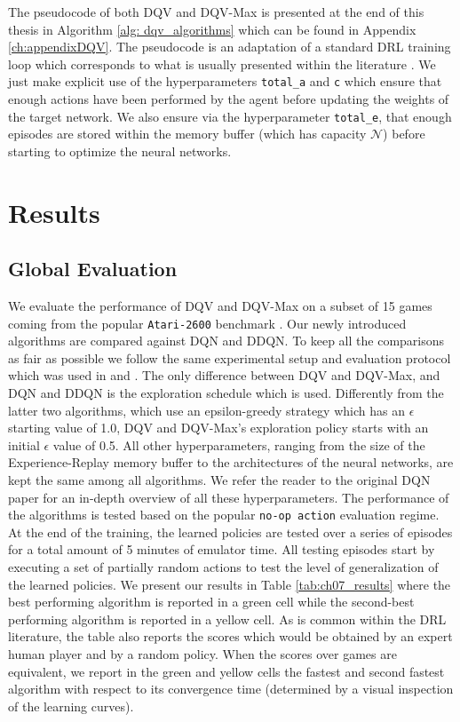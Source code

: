 The pseudocode of both DQV and DQV-Max is presented at the end of this thesis in Algorithm \ref{alg: dqv_algorithms} which can be found in Appendix \ref{ch:appendixDQV}. The pseudocode is an adaptation of a standard DRL training loop which corresponds to what is usually presented within the literature \cite{mnih2015human}. We just make explicit use of the hyperparameters \texttt{total\_a} and \texttt{c} which ensure that enough actions have been performed by the agent before updating the weights of the target network. We also ensure via the hyperparameter \texttt{total\_e}, that enough episodes are stored within the memory buffer (which has capacity $\mathcal{N}$) before starting to optimize the neural networks. 



\section{Results}
\label{sec:ijcnn_results}

\subsection{Global Evaluation}
\label{sec:global_evaluation}

We evaluate the performance of DQV and DQV-Max on a subset of 15 games coming from the popular \texttt{Atari-2600} benchmark \cite{bellemare2013arcade}. Our newly introduced algorithms are compared against DQN and DDQN. To keep all the comparisons as fair as possible we follow the same experimental setup and evaluation protocol which was used in \cite{mnih2015human} and \cite{van2016deep}. The only difference between DQV and DQV-Max, and DQN and DDQN is the exploration schedule which is used. Differently from the latter two algorithms, which use an epsilon-greedy strategy which has an $\epsilon$ starting value of 1.0, DQV and DQV-Max's exploration policy starts with an initial $\epsilon$ value of 0.5. All other hyperparameters, ranging from the size of the Experience-Replay memory buffer to the architectures of the neural networks, are kept the same among all algorithms. We refer the reader to the original DQN paper \cite{mnih2015human} for an in-depth overview of all these hyperparameters. The performance of the algorithms is tested based on the popular \texttt{no-op action} evaluation regime. At the end of the training, the learned policies are tested over a series of episodes for a total amount of 5 minutes of emulator time. All testing episodes start by executing a set of partially random actions to test the level of generalization of the learned policies. We present our results in Table \ref{tab:ch07_results} where the best performing algorithm is reported in a green cell while the second-best performing algorithm is reported in a yellow cell. As is common within the DRL literature, the table also reports the scores which would be obtained by an expert human player and by a random policy. When the scores over games are equivalent, we report in the green and yellow cells the fastest and second fastest algorithm with respect to its convergence time (determined by a visual inspection of the learning curves). 

